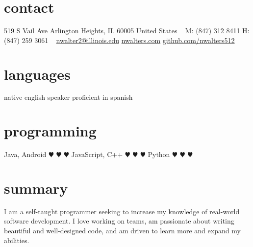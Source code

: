 \documentclass[]{resume} %
\begin{document}


\begin{aside} %
\section{contact}
519 S Vail Ave
Arlington Heights, IL 60005
United States
~
M: (847) 312 8411
H: (847) 259 3061
~
\href{mailto:nwalter2@illinois.edu}{nwalter2@illinois.edu}
\href{http://www.nwalters.com}{nwalters.com}
\href{http://github.com/nwalters512}{github.com/nwalters512}
\section{languages}
native english speaker
proficient in spanish
\section{programming}
Java, Android {\color{red} $\varheartsuit$} {\color{red} $\varheartsuit$} {\color{red} $\varheartsuit$}  
JavaScript, C++ {\color{red} $\varheartsuit$} {\color{red} $\varheartsuit$} {\color{white} $\varheartsuit$} 
Python {\color{red} $\varheartsuit$} {\color{white} $\varheartsuit$} {\color{white} $\varheartsuit$} 
\end{aside}


\section{summary}

I am a self-taught programmer seeking to increase my knowledge of real-world software development. I love working on teams, am passionate about writing beautiful and well-designed code, and am driven to learn more and expand my abilities.

\end{document}

